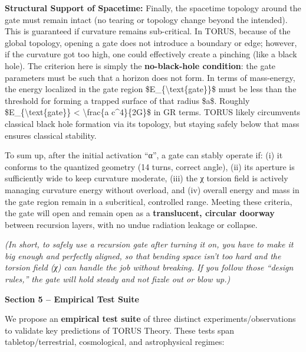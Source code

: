 \documentclass[]{article}
\begin{document}
\begin{itemize}
  \textbf{Structural Support of Spacetime:} Finally, the spacetime
  topology around the gate must remain intact (no tearing or topology
  change beyond the intended). This is guaranteed if curvature remains
  sub-critical. In TORUS, because of the global topology, opening a gate
  does not introduce a boundary or edge; however, if the curvature got
  too high, one could effectively create a pinching (like a black hole).
  The criterion here is simply the \textbf{no-black-hole condition}: the
  gate parameters must be such that a horizon does not form. In terms of
  mass-energy, the energy localized in the gate region
  \$E\_\{\textbackslash{}text\{gate\}\}\$ must be less than the
  threshold for forming a trapped surface of that radius \$a\$. Roughly
  \$E\_\{\textbackslash{}text\{gate\}\} \textless{}
  \textbackslash{}frac\{a c\^{}4\}\{2G\}\$ in GR terms. TORUS likely
  circumvents classical black hole formation via its topology, but
  staying safely below that mass ensures classical stability.
\end{itemize}

To sum up, after the initial activation ``α'', a gate can stably operate
if: (i) it conforms to the quantized geometry (14 turns, correct angle),
(ii) its aperture is sufficiently wide to keep curvature moderate, (iii)
the χ torsion field is actively managing curvature energy without
overload, and (iv) overall energy and mass in the gate region remain in
a subcritical, controlled range. Meeting these criteria, the gate will
open and remain open as a \textbf{translucent, circular doorway} between
recursion layers, with no undue radiation leakage or collapse.

\emph{(In short, to safely use a recursion gate after turning it on, you
have to make it big enough and perfectly aligned, so that bending space
isn't too hard and the torsion field (χ) can handle the job without
breaking. If you follow those ``design rules,'' the gate will hold
steady and not fizzle out or blow up.)}

\textbf{Section 5 -- Empirical Test Suite}

We propose an \textbf{empirical test suite} of three distinct
experiments/observations to validate key predictions of TORUS Theory.
These tests span tabletop/terrestrial, cosmological, and astrophysical
regimes:
\end{document}
